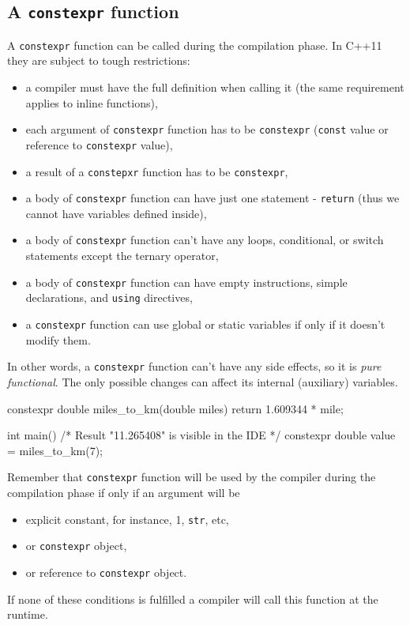 \documentclass[../main]{subfiles}
\begin{document}
\subsection{A \texttt{constexpr} function}
A \texttt{constexpr} function can be called during the compilation phase. In C++11 they are subject to tough restrictions:
\begin{itemize}
    \item a compiler must have the full definition when calling it (the same requirement applies to inline functions),
    \item each argument of \texttt{constexpr} function has to be \texttt{constexpr} (\texttt{const} value or reference to \texttt{constexpr} value),
    \item a result of a \texttt{constepxr} function has to be \texttt{constexpr},
    \item a body of \texttt{constexpr} function can have just one statement - \texttt{return} (thus we cannot have variables defined inside),
    \item a body of \texttt{constexpr} function can't have any loops, conditional, or switch statements except the ternary operator,
    \item a body of \texttt{constexpr} function can have empty instructions, simple declarations, and \texttt{using} directives,
    \item a \texttt{constexpr} function can use global or static variables if only if it doesn't modify them.
\end{itemize}

    In other words, a \texttt{constexpr} function can't have any side effects, so it is \textit{pure functional}. The only possible changes can affect its internal (auxiliary) variables.
\begin{Code}
    constexpr double miles_to_km(double miles)
    {
        return 1.609344 * mile;
    }
    
    int main()
    {
        /* Result "11.265408" is visible in the IDE */
        constexpr double value = miles_to_km(7);
    }
\end{Code}

    Remember that \texttt{constexpr} function will be used by the compiler during the compilation phase if only if an argument will be
\begin{itemize}
    \item explicit constant, for instance, 1, \texttt{str}, etc,
    \item or \texttt{constexpr} object,
    \item or reference to \texttt{constexpr} object.
\end{itemize}
\noindent
If none of these conditions is fulfilled a compiler will call this function at the runtime.
\end{document}
